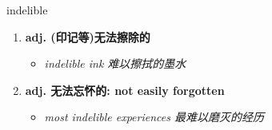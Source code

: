 
\begin{frame}
{\huge indelible}
\begin{center}
\begin{enumerate}\Large
  \item \textbf{adj. (印记等)无法擦除的}
  \begin{itemize}
    \item \em{\Large{indelible ink 难以擦拭的墨水}}
  \end{itemize}
  \item \textbf{adj. 无法忘怀的: not easily forgotten}
  \begin{itemize}
    \item \em{\Large{most indelible experiences 最难以磨灭的经历}}
  \end{itemize}
\end{enumerate}
\end{center}
\end{frame}
